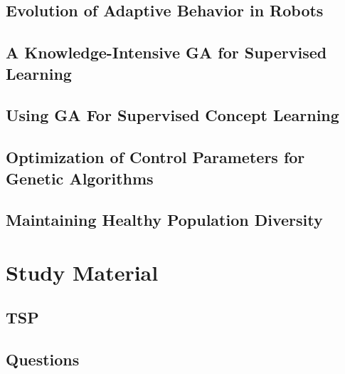\documentclass[a4paper, 10pt, oneside]{memoir}
\theoremstyle{definition}
\begin{document}
\chapter{Evolution of Adaptive Behavior in Robots}


\chapter{A Knowledge-Intensive GA for Supervised Learning}


\chapter{Using GA For Supervised Concept Learning}


\chapter{Optimization of Control Parameters for Genetic Algorithms}


\chapter{Maintaining Healthy Population Diversity}


\part{Study Material}

\chapter{TSP}


\chapter{Questions}



\newpage
\appendix
\printbibliography
\end{document}
